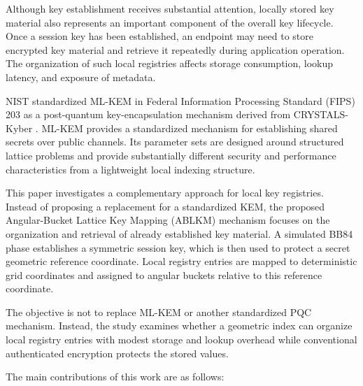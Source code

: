 \documentclass[journal,twocolumn]{IEEEtran}
\begin{document}
Although key establishment receives substantial attention, locally stored key material also represents an important component of the overall key lifecycle. Once a session key has been established, an endpoint may need to store encrypted key material and retrieve it repeatedly during application operation. The organization of such local registries affects storage consumption, lookup latency, and exposure of metadata.

NIST standardized ML-KEM in Federal Information Processing Standard (FIPS) 203 as a post-quantum key-encapsulation mechanism derived from CRYSTALS-Kyber \cite{nist2024}. ML-KEM provides a standardized mechanism for establishing shared secrets over public channels. Its parameter sets are designed around structured lattice problems and provide substantially different security and performance characteristics from a lightweight local indexing structure.

This paper investigates a complementary approach for local key registries. Instead of proposing a replacement for a standardized KEM, the proposed Angular-Bucket Lattice Key Mapping (ABLKM) mechanism focuses on the organization and retrieval of already established key material. A simulated BB84 phase establishes a symmetric session key, which is then used to protect a secret geometric reference coordinate. Local registry entries are mapped to deterministic grid coordinates and assigned to angular buckets relative to this reference coordinate.

The objective is not to replace ML-KEM or another standardized PQC mechanism. Instead, the study examines whether a geometric index can organize local registry entries with modest storage and lookup overhead while conventional authenticated encryption protects the stored values.

The main contributions of this work are as follows:
\end{document}
